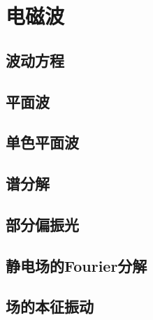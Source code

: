 \chapter{电磁波}

\section{波动方程}

\section{平面波}

\section{单色平面波}

\section{谱分解}

\section{部分偏振光}

\section{静电场的Fourier分解}

\section{场的本征振动}
